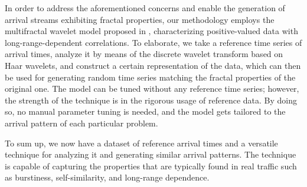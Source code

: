 In order to address the aforementioned concerns and enable the generation of
arrival streams exhibiting fractal properties, our methodology employs the
multifractal wavelet model proposed in \cite{riedi1999}, characterizing
positive-valued data with long-range-dependent correlations. To elaborate, we
take a reference time series of arrival times, analyze it by means of the
discrete wavelet transform based on Haar wavelets, and construct a certain
representation of the data, which can then be used for generating random time
series matching the fractal properties of the original one. The model can be
tuned without any reference time series; however, the strength of the technique
is in the rigorous usage of reference data. By doing so, no manual parameter
tuning is needed, and the model gets tailored to the arrival pattern of each
particular problem.

To sum up, we now have a dataset of reference arrival times and a versatile
technique for analyzing it and generating similar arrival patterns. The
technique is capable of capturing the properties that are typically found in
real traffic such as burstiness, self-similarity, and long-range dependence.
